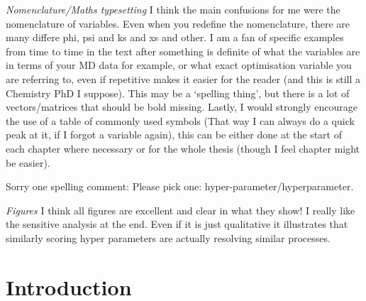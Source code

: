 \emph{Nomenclature/Maths typesetting}
I think the main confusions for me were the nomenclature of variables. Even when you redefine the nomenclature, there are many differe phi, psi and ks and xs and other. I am a fan of specific examples from time to time in the text after something is definite of what the variables are in terms of your MD data for example, or what exact optimisation variable you are referring to, even if repetitive makes it easier for the reader (and this is still a Chemistry PhD I suppose). This may be a ‘spelling thing’, but there is a lot of vectors/matrices that should be bold missing. 
Lastly, I would strongly encourage the use of a table of commonly used symbols (That way I can always do a quick peak at it, if I forgot a variable again), this can be either done at the start of each chapter where necessary or for the whole thesis (though I feel chapter might be easier). 

Sorry one spelling comment: Please pick one: hyper-parameter/hyperparameter. 

\emph{Figures}
I think all figures are excellent and clear in what they show! I really like the sensitive analysis at the end. Even if it is just qualitative it illustrates that similarly scoring hyper parameters are actually resolving similar processes. 




\section{Introduction}

